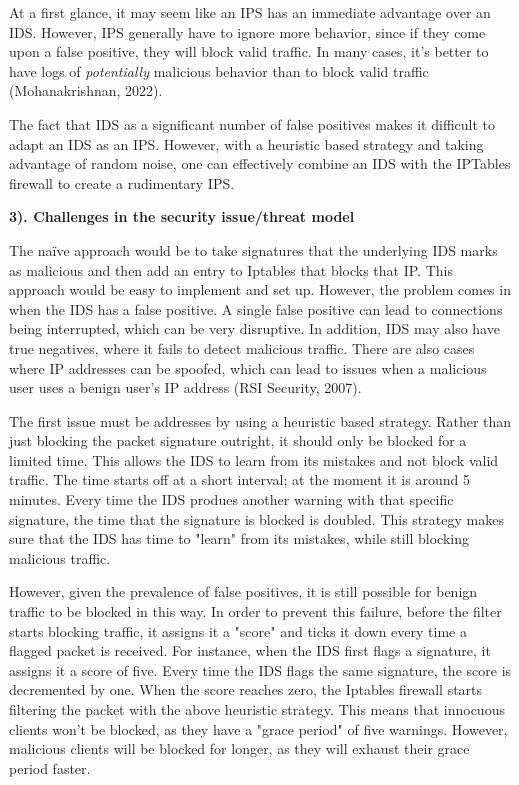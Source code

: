 \documentclass[12pt]{article}
\begin{document}
\begin{flushleft}
\begin{multicols}{2}
At a first glance, it may seem like an IPS has an immediate advantage over an IDS. However, IPS generally have to ignore more behavior, since if they come upon a false positive, they will block valid traffic. In many cases, it's better to have logs of \textit{potentially} malicious behavior than to block valid traffic (Mohanakrishnan, 2022). 

The fact that IDS as a significant number of false positives makes it difficult to adapt an IDS as an IPS. However, with a heuristic based strategy and taking advantage of random noise, one can effectively combine an IDS with the IPTables firewall to create a rudimentary IPS.

\textbf{3). Challenges in the security issue/threat model}

The na\"{i}ve approach would be to take signatures that the underlying IDS marks as malicious and then add an entry to Iptables that blocks that IP. This approach would be easy to implement and set up. However, the problem comes in when the IDS has a false positive. A single false positive can lead to connections being interrupted, which can be very disruptive. In addition, IDS may also have true negatives, where it fails to detect malicious traffic. There are also cases where IP addresses can be spoofed, which can lead to issues when a malicious user uses a benign user's IP address (RSI Security, 2007).

The first issue must be addresses by using a heuristic based strategy. Rather than just blocking the packet signature outright, it should only be blocked for a limited time. This allows the IDS to learn from its mistakes and not block valid traffic. The time starts off at a short interval; at the moment it is around 5 minutes. Every time the IDS produes another warning with that specific signature, the time that the signature is blocked is doubled. This strategy makes sure that the IDS has time to "learn" from its mistakes, while still blocking malicious traffic.

However, given the prevalence of false positives, it is still possible for benign traffic to be blocked in this way. In order to prevent this failure, before the filter starts blocking traffic, it assigns it a "score" and ticks it down every time a flagged packet is received. For instance, when the IDS first flags a signature, it assigns it a score of five. Every time the IDS flags the same signature, the score is decremented by one. When the score reaches zero, the Iptables firewall starts filtering the packet with the above heuristic strategy. This means that innocuous clients won't be blocked, as they have a "grace period" of five warnings. However, malicious clients will be blocked for longer, as they will exhaust their grace period faster.


\end{multicols}
\end{flushleft}
\end{document}
